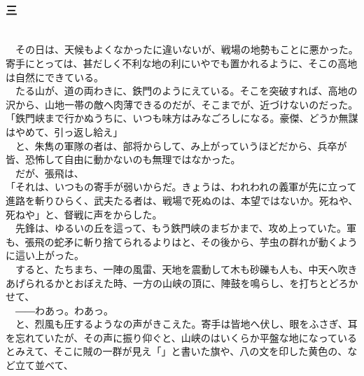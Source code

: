 \documentclass[
  paper=a5,
  fontsize=10pt,
  jafontsize=9.5pt,
  tate,                  %
  open_bracket_pos=nibu, %
]{jlreq}
\begin{document}
\\

\subsubsection{三}

\\


　その日は、天候もよくなかったに違いないが、戦場の地勢もことに悪かった。寄手にとっては、甚だしく不利な地の利にいやでも置かれるように、そこの高地は自然にできている。\\


　たる山が、道の両わきに、鉄門のようにえている。そこを突破すれば、高地の沢から、山地一帯の敵へ肉薄できるのだが、そこまでが、近づけないのだった。\\


「鉄門峡まで行かぬうちに、いつも味方はみなごろしになる。豪傑、どうか無謀はやめて、引っ返し給え」\\


　と、朱雋の軍隊の者は、部将からして、み上がっていうほどだから、兵卒が皆、恐怖して自由に動かないのも無理ではなかった。\\


　だが、張飛は、\\


「それは、いつもの寄手が弱いからだ。きょうは、われわれの義軍が先に立って進路を斬りひらく、武夫たる者は、戦場で死ぬのは、本望ではないか。死ねや、死ねや」と、督戦に声をからした。\\


　先鋒は、ゆるいの丘を這って、もう鉄門峡のまぢかまで、攻め上っていた。軍も、張飛の蛇矛に斬り捨てられるよりはと、その後から、芋虫の群れが動くように這い上がった。\\


　すると、たちまち、一陣の風雷、天地を震動して木も砂礫も人も、中天へ吹きあげられるかとおぼえた時、一方の山峡の頂に、陣鼓を鳴らし、を打ちとどろかせて、\\


　――わあっ。わあっ。\\


　と、烈風も圧するようなの声がきこえた。寄手は皆地へ伏し、眼をふさぎ、耳を忘れていたが、その声に振り仰ぐと、山峡のはいくらか平盤な地になっているとみえて、そこに賊の一群が見え「」と書いた旗や、八の文を印した黄色の、など立て並べて、\\
\end{document}
